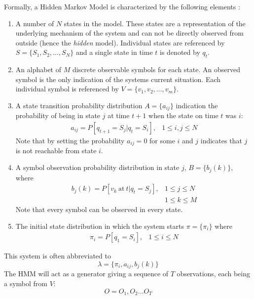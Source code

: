 Formally, a Hidden Markov Model is characterized by the following elements
\cite{rabiner1989tutorial}:
\begin{enumerate}
	\item A number of $N$ states in the model. These states are a
	representation of the underlying mechanism of the system and can not be
	directly observed from outside (hence the \emph{hidden} model). Individual
	states are referenced by $S = \{S_1, S_2, \dots, S_N \}$ and a single
	state in time $t$ is denoted by $q_t$.
	\item An alphabet of $M$ discrete observable symbols for each state. An
	observed symbol is the only indication of the systems current situation.
	Each individual symbol is referenced by $V = \{ v_1, v_2, \dots, v_m \}$.
	\item A state transition probability distribution $A = \{ a_{ij} \}$
	indication the probability of being in state $j$ at time $t+1$ when the
	state on time $t$ was $i$:
	\begin{eqnarray}
		a_{ij} = P [ q_{t+1} = S_j | q_t = S_i ], & 1 \le i, j \le N
	\end{eqnarray}
	Note that by setting the probability $a_{ij}=0$ for some $i$ and $j$
	indicates that $j$ is not reachable from state $i$.
	\item A symbol observation probability distribution in state $j$, $B = \{
	b_j(k) \}$, where
	\begin{eqnarray}
	b_j(k) = P[ v_k\ \mathrm{at} \ t | q_t = S_j], & 1 \le j \le N \nonumber \\
	& 1 \le k \le M
	\end{eqnarray}
	Note that every symbol can be observed in every state.
	\item The initial state distribution in which the system starts $\pi= \{
	\pi_i \}$ where
	\begin{eqnarray}
	\pi_i = P[q_1 = S_i], & 1 \le i \le N
	\end{eqnarray}
\end{enumerate}
This system is often abbreviated to
\begin{equation}
	\lambda = \{ \pi_i, a_{ij}, b_j(k)\}
\end{equation}
The HMM will act as a generator giving a sequence of $T$ observations, each
being a symbol from $V$:
\begin{equation}
	O = O_1, O_2 \dots O_T
\end{equation}

